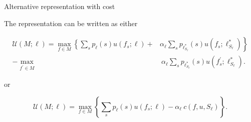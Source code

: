 \documentclass[usenames,dvipsnames,aspectratio=169,11pt, handout]{beamer}
\begin{document}
\begin{frame}{Alternative representation with cost}\label{cost}

	The representation can be written as either

	\[
		\begin{aligned}
			\mathcal{U} \left(M ; \ell \right) = \max _{f \in M}\left\{\sum_{s} p_{\ell} \left( s \right) u \left( f_{s} ; \ell \right) + \right. & \left. \alpha_{\ell} \sum_{s} p_{\ell^{*}_{S_{\ell}}} \left( s \right) u \left( f_{s} ; \ell^{*}_{S_{\ell}} \right) \right\} \\
			-\max _{f^{\prime} \in M}                                                                                                             & \: \alpha _{\ell} \sum_{s} p_{\ell^{*}_{S_{\ell}}} \left( s \right) u\left(f^{\prime}_{s} ; \ell^{*}_{S_{\ell}} \right) .
		\end{aligned}
	\]

	or

	\[
		\mathcal{U} \left(M ; \ell \right) = \max _{f \in M}\left\{\sum_{s} p_{\ell} \left( s \right) u \left( f_{s} ; \ell \right) - \alpha_{\ell} \:  c \left( f, u, S_{\ell} \right) \right\} .
	\]

	\begin{flushright}
		\hyperlink{fullmodel}{}
	\end{flushright}

\end{frame}
\end{document}
